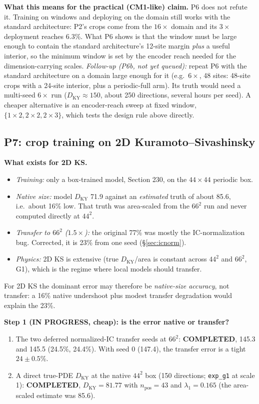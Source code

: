\documentclass[11pt]{article}
\begin{document}
\textbf{What this means for the practical (CM1-like) claim.} P6 does not
refute it. Training on windows and deploying on the domain still works
with the standard architecture: P2's crops come from the $16\times$
domain and its $3\times$ deployment reaches 6.3\%. What P6 shows is that
the window must be large enough to contain the standard architecture's
12-site margin \emph{plus} a useful interior, so the minimum window is
set by the encoder reach needed for the dimension-carrying scales.
\emph{Follow-up (P6b, not yet queued):} repeat P6 with the standard
architecture on a domain large enough for it (e.g.\ $6\times$, 48 sites:
48-site crops with a 24-site interior, plus a periodic-full arm). Its
truth would need a multi-seed $6\times$ run ($D_{\mathrm{KY}}\approx150$,
about 250 directions, several hours per seed). A cheaper alternative is
an encoder-reach sweep at fixed window, $\{1\times2, 2\times2,
2\times3\}$, which tests the design rule above directly.

\subsection{P7: crop training on 2D Kuramoto--Sivashinsky}
\label{sec:p7}

\textbf{What exists for 2D KS.}
\begin{itemize}[leftmargin=*]
\item \emph{Training:} only a box-trained model, Section 230, on the
  $44\times44$ periodic box.
\item \emph{Native size:} model $D_{\mathrm{KY}}$ 71.9 against an
  \emph{estimated} truth of about 85.6, i.e.\ about 16\% low. That truth
  was area-scaled from the $66^2$ run and never computed directly at
  $44^2$.
\item \emph{Transfer to $66^2$ ($1.5\times$):} the original 77\% was
  mostly the IC-normalization bug. Corrected, it is 23\% from one seed
  (\S\ref{sec:icnorm}).
\item \emph{Physics:} 2D KS is extensive (true $D_{\mathrm{KY}}$/area is
  constant across $44^2$ and $66^2$, G1), which is the regime where local
  models should transfer.
\end{itemize}
For 2D KS the dominant error may therefore be \emph{native-size
accuracy}, not transfer: a 16\% native undershoot plus modest transfer
degradation would explain the 23\%.

\textbf{Step 1 (IN PROGRESS, cheap): is the error native or transfer?}
\begin{enumerate}[label=(\alph*),leftmargin=*]
\item The two deferred normalized-IC transfer seeds at $66^2$:
  \textbf{COMPLETED}, 145.3 and 145.5 (24.5\%, 24.4\%). With seed 0
  (147.4), the transfer error is a tight $24\pm0.5$\%.
\item A direct true-PDE $D_{\mathrm{KY}}$ at the native $44^2$ box
  (150 directions; \texttt{exp\_g1} at scale 1): \textbf{COMPLETED},
  $D_{\mathrm{KY}}=81.77$ with $n_{\mathrm{pos}}=43$ and $\lambda_1=0.165$
  (the area-scaled estimate was 85.6).
\end{enumerate}
\end{document}
